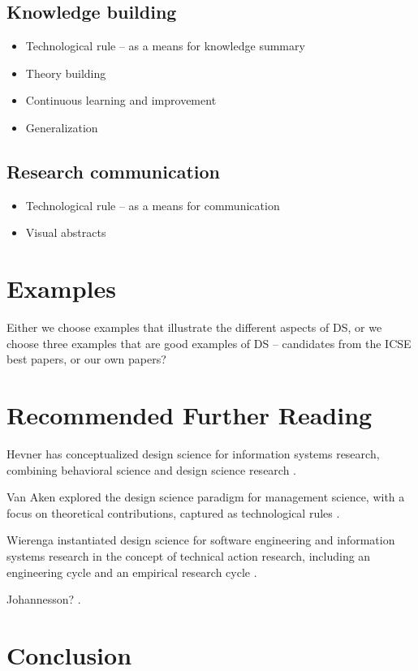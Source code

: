\documentclass[graybox]{svmult}
\begin{document}
\subsection{Knowledge building}
\label{sec:knowledge}

\begin{itemize}
\item Technological rule -- as a means for knowledge summary
\item Theory building
\item Continuous learning and improvement
\item Generalization
\end{itemize}

\subsection{Research communication}
\label{sec:communication}

\begin{itemize}
\item Technological rule -- as a means for communication
\item Visual abstracts
\end{itemize}

\cite{CarverIEEESW2018}

\section{Examples}
Either we choose examples that illustrate the different aspects of DS, or we choose three examples that are good examples of DS -- candidates from the ICSE best papers, or our own papers?



\section{Recommended Further Reading}

Hevner has conceptualized design science for information systems research, combining behavioral science and design science research \cite{hevner_design_2004,hevner_design_2010}.

Van Aken explored the design science paradigm for management science, with a focus on theoretical contributions, captured as technological rules \cite{van_aken_management_2004,van_aken_management_2005}. 

Wierenga instantiated design science for software engineering and information systems research in the concept of technical action research, including an engineering cycle and an empirical research cycle \cite{wieringa_design_2009,wieringa_six_2015,wieringa_technical_2012,wieringa_what_2014}.

Johannesson? \cite{johannesson_introduction_2014}.

\section{Conclusion}





\end{document}
